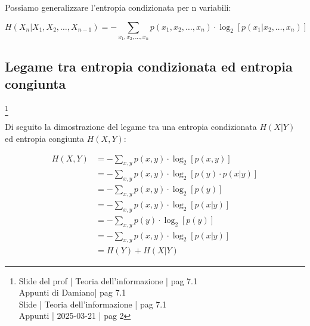 Possiamo generalizzare l'entropia condizionata per n variabili: 

{
    \Large 
    \begin{equation}
        H (X_n | X_1, X_2, \dots, X_{n-1}) 
        = 
        - 
        \sum_{x_1, x_2, \dots, x_n}
         p(x_1, x_2, \dots, x_n) \cdot \log_{2} \left[ p(x_1 | x_2, \dots, x_n)\right]
    \end{equation}
}

\newpage 

\subsection{Legame tra entropia condizionata ed entropia congiunta}
\footnote{Slide del prof | Teoria dell'informazione | pag 7.1 \\  
Appunti di Damiano| pag 7.1 \\
Slide | Teoria dell'informazione | pag 7.1 \\
Appunti | 2025-03-21 | pag 2
}

Di seguito la dimostrazione del legame tra una entropia condizionata $H (X | Y)$ 
ed entropia congiunta $H(X , Y)$: 

{
    \Large 
    \begin{equation}
        \begin{split}
            H(X, Y)
            &= 
            - \sum_{x, y} 
            p(x , y)
            \cdot 
            \log_{2}
            \left[
                p(x, y)
            \right]
            \\
            &= 
            - \sum_{x, y} 
            p(x , y)
            \cdot 
            \log_{2}
            \left[
                p(y)
                \cdot 
                p(x | y)
            \right]
            \\
            &=
            - \sum_{x, y} 
            p(x , y)
            \cdot 
            \log_{2}
            \left[
                p(y)
            \right]
            \\
            &=
            - \sum_{x, y} 
            p(x , y)
            \cdot 
            \log_{2}
            \left[
                p(x | y)
            \right]
            \\
            &=
            - \sum_{x, y} 
            p(y)
            \cdot 
            \log_{2}
            \left[
                p(y)
            \right]
            \\
            &=
            - \sum_{x, y} 
            p(x, y)
            \cdot 
            \log_{2}
            \left[
                p(x | y)
            \right]
            \\
            &= 
            H(Y) + H(X | Y)
        \end{split}
    \end{equation}
}

